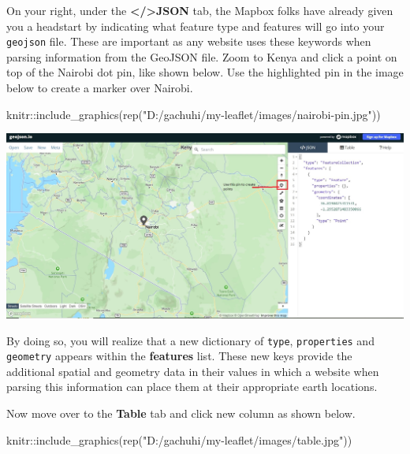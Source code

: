 \documentclass[
]{book}
\newenvironment{Shaded}{\begin{snugshade}}{\end{snugshade}}
\newcommand{\FunctionTok}[1]{\textcolor[rgb]{0.00,0.00,0.00}{#1}}
\newcommand{\NormalTok}[1]{#1}
\newcommand{\SpecialCharTok}[1]{\textcolor[rgb]{0.00,0.00,0.00}{#1}}
\newcommand{\StringTok}[1]{\textcolor[rgb]{0.31,0.60,0.02}{#1}}
\begin{document}
On your right, under the \textbf{\textless/\textgreater JSON} tab, the Mapbox folks have already given you a headstart by indicating what feature type and features will go into your \texttt{geojson} file. These are important as any website uses these keywords when parsing information from the GeoJSON file. Zoom to Kenya and click a point on top of the Nairobi dot pin, like shown below. Use the highlighted pin in the image below to create a marker over Nairobi.

\begin{Shaded}
\begin{Highlighting}[]
\NormalTok{knitr}\SpecialCharTok{::}\FunctionTok{include\_graphics}\NormalTok{(}\FunctionTok{rep}\NormalTok{(}\StringTok{"D:/gachuhi/my{-}leaflet/images/nairobi{-}pin.jpg"}\NormalTok{))}
\end{Highlighting}
\end{Shaded}

\includegraphics[width=26.67in]{../images/nairobi-pin}

By doing so, you will realize that a new dictionary of \texttt{type}, \texttt{properties} and \texttt{geometry} appears within the \textbf{features} list. These new keys provide the additional spatial and geometry data in their values in which a website when parsing this information can place them at their appropriate earth locations.

Now move over to the \textbf{Table} tab and click new column as shown below.

\begin{Shaded}
\begin{Highlighting}[]
\NormalTok{knitr}\SpecialCharTok{::}\FunctionTok{include\_graphics}\NormalTok{(}\FunctionTok{rep}\NormalTok{(}\StringTok{"D:/gachuhi/my{-}leaflet/images/table.jpg"}\NormalTok{))}
\end{Highlighting}
\end{Shaded}
\end{document}
